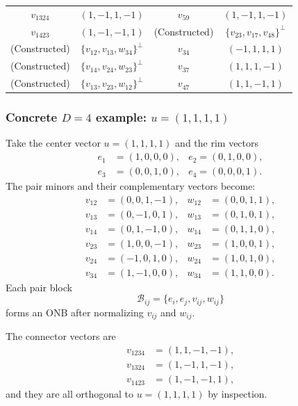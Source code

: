 \documentclass[%
  reprint,
  superscriptaddress,
  showpacs,
  showkeys,
  amsmath,amssymb,
  pra,
  longbibliography,
  floatfix,
  x11names
]{revtex4-2}
\newcommand{\rev}[1]{{\color{revisionblue}#1}}
\begin{document}
\begin{table}[ht]
\begin{ruledtabular}
\begin{tabular}{cccc}
$v_{1324}$ & $(1,-1,1,-1)$ & $v_{59}$ & $(1,-1,1,-1)$ \\
$v_{1423}$ & $(1,-1,-1,1)$ & \rev{(Constructed)} & \rev{$\{v_{23},v_{17},v_{48}\}^\perp$} \\
\hline
(Constructed) & $\{v_{12}, v_{13}, w_{34}\}^\perp$ & $v_{34}$ & $(-1,1,1,1)$ \\
(Constructed) & $\{v_{14}, v_{24}, w_{23}\}^\perp$ & $v_{37}$ & $(1,1,1,-1)$ \\
\rev{(Constructed)} & \rev{$\{v_{13},v_{23},w_{12}\}^\perp$} & \rev{$v_{47}$} & \rev{$(1,1,-1,1)$} \\
\end{tabular}
\end{ruledtabular}
\end{table}





\subsubsection{Concrete $D=4$ example: $u=(1,1,1,1)$}

Take the center vector $u=(1,1,1,1)$ and the rim vectors
\begin{align*}
e_1&=(1,0,0,0),& e_2 =(0,1,0,0),\\
e_3&=(0,0,1,0),& e_4 =(0,0,0,1).
\end{align*}
The pair minors and their complementary vectors become:
\begin{align*}
v_{12}&=(0,0,1,-1), & w_{12}&=(0,0,1,1),\\
v_{13}&=(0,-1,0,1), & w_{13}&=(0,1,0,1),\\
v_{14}&=(0,1,-1,0), & w_{14}&=(0,1,1,0),\\
v_{23}&=(1,0,0,-1), & w_{23}&=(1,0,0,1),\\
v_{24}&=(-1,0,1,0), & w_{24}&=(1,0,1,0),\\
v_{34}&=(1,-1,0,0), & w_{34}&=(1,1,0,0).
\end{align*}
Each pair block
\[
\mathcal{B}_{ij}=\{e_i, e_j, v_{ij}, w_{ij}\}
\]
forms an ONB after normalizing $v_{ij}$ and $w_{ij}$.

The connector vectors are
\begin{align*}
v_{1234}&=(1,1,-1,-1),\\
v_{1324}& =(1,-1,1,-1),\\
v_{1423}&=(1,-1,-1,1),
\end{align*}
and they are all orthogonal to $u=(1,1,1,1)$ by inspection.
\end{document}
